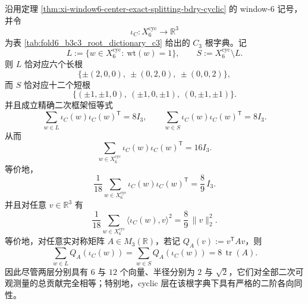 \begin{theorem}\label{thm:xi-window6-c3-quadratic-energy-equipartition}
沿用定理 \ref{thm:xi-window6-center-exact-splitting-bdry-cyclic} 的 window-\(6\) 记号，并令
\[
\iota_C:X_6^{\mathrm{cyc}}\to \mathbb R^3
\]
为表 \ref{tab:fold6_b3c3_root_dictionary_c3} 给出的 \(C_3\) 根字典。记
\[
L:=\{w\in X_6^{\mathrm{cyc}}:\ \mathrm{wt}(w)=1\},
\qquad
S:=X_6^{\mathrm{cyc}}\setminus L.
\]
则 \(L\) 恰对应六个长根
\[
\{\pm(2,0,0),\ \pm(0,2,0),\ \pm(0,0,2)\},
\]
而 \(S\) 恰对应十二个短根
\[
\{(\pm1,\pm1,0),\ (\pm1,0,\pm1),\ (0,\pm1,\pm1)\}.
\]
并且成立精确二次框架恒等式
\[
\boxed{\;
\sum_{w\in L}\iota_C(w)\iota_C(w)^{\mathsf T}=8I_3,\qquad
\sum_{w\in S}\iota_C(w)\iota_C(w)^{\mathsf T}=8I_3.\;}
\]
从而
\[
\boxed{\;
\sum_{w\in X_6^{\mathrm{cyc}}}\iota_C(w)\iota_C(w)^{\mathsf T}=16I_3.\;}
\]
等价地，
\[
\boxed{\;
\frac1{18}\sum_{w\in X_6^{\mathrm{cyc}}}\iota_C(w)\iota_C(w)^{\mathsf T}
=
\frac89\,I_3.\;}
\]
并且对任意 \(v\in\mathbb R^3\) 有
\[
\boxed{\;
\frac1{18}\sum_{w\in X_6^{\mathrm{cyc}}}\langle \iota_C(w),v\rangle^2
=
\frac89\,\|v\|_2^2.\;}
\]
等价地，对任意实对称矩阵 \(A\in M_3(\mathbb R)\)，若记 \(Q_A(v):=v^{\mathsf T}Av\)，则
\[
\boxed{\;
\sum_{w\in L}Q_A(\iota_C(w))
=
\sum_{w\in S}Q_A(\iota_C(w))
=
8\,\operatorname{tr}(A).\;}
\]
因此尽管两层分别具有 \(6\) 与 \(12\) 个向量、半径分别为 \(2\) 与 \(\sqrt2\)，它们对全部二次可观测量的总贡献完全相等；特别地，cyclic 层在该根字典下具有严格的二阶各向同性。
\end{theorem}
